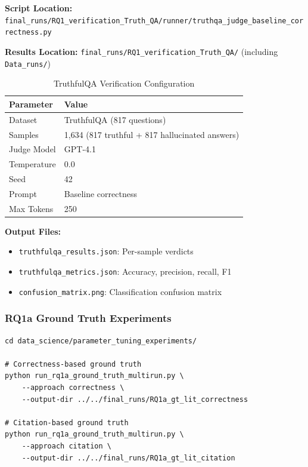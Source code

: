 \textbf{Script Location:} \texttt{final\_runs/RQ1\_verification\_Truth\_QA/runner/truthqa\_judge\_baseline\_correctness.py}

\textbf{Results Location:} \texttt{final\_runs/RQ1\_verification\_Truth\_QA/} (including \texttt{Data\_runs/})

\begin{table}[H]
\centering
\caption{TruthfulQA Verification Configuration}
\label{tab:truthqa_config}
\footnotesize
\begin{tabular}{@{}ll@{}}
\toprule
\textbf{Parameter} & \textbf{Value} \\
\midrule
Dataset & TruthfulQA (817 questions) \\
Samples & 1,634 (817 truthful + 817 hallucinated answers) \\
Judge Model & GPT-4.1 \\
Temperature & 0.0 \\
Seed & 42 \\
Prompt & Baseline correctness \\
Max Tokens & 250 \\
\bottomrule
\end{tabular}
\end{table}

\textbf{Output Files:}
\begin{itemize}[noitemsep]
    \item \texttt{truthfulqa\_results.json}: Per-sample verdicts
    \item \texttt{truthfulqa\_metrics.json}: Accuracy, precision, recall, F1
    \item \texttt{confusion\_matrix.png}: Classification confusion matrix
\end{itemize}

\subsubsection{RQ1a Ground Truth Experiments}

\begin{verbatim}
cd data_science/parameter_tuning_experiments/

# Correctness-based ground truth
python run_rq1a_ground_truth_multirun.py \
    --approach correctness \
    --output-dir ../../final_runs/RQ1a_gt_lit_correctness

# Citation-based ground truth
python run_rq1a_ground_truth_multirun.py \
    --approach citation \
    --output-dir ../../final_runs/RQ1a_gt_lit_citation
\end{verbatim}

